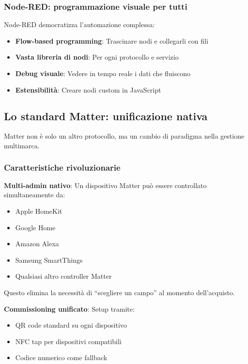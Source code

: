 \subsubsection{Node-RED: programmazione visuale per tutti}

Node-RED democratizza l'automazione complessa:

\begin{itemize}
    \item \textbf{Flow-based programming}: Trascinare nodi e collegarli con fili
    \item \textbf{Vasta libreria di nodi}: Per ogni protocollo e servizio
    \item \textbf{Debug visuale}: Vedere in tempo reale i dati che fluiscono
    \item \textbf{Estensibilità}: Creare nodi custom in JavaScript
\end{itemize}

\subsection{Lo standard Matter: unificazione nativa}

Matter non è solo un altro protocollo, ma un cambio di paradigma nella gestione multimarca.

\subsubsection{Caratteristiche rivoluzionarie}

\textbf{Multi-admin nativo}: Un dispositivo Matter può essere controllato simultaneamente da:
\begin{itemize}
    \item Apple HomeKit
    \item Google Home
    \item Amazon Alexa
    \item Samsung SmartThings
    \item Qualsiasi altro controller Matter
\end{itemize}

Questo elimina la necessità di ``scegliere un campo'' al momento dell'acquisto.

\textbf{Commissioning unificato}: Setup tramite:
\begin{itemize}
    \item QR code standard su ogni dispositivo
    \item NFC tap per dispositivi compatibili
    \item Codice numerico come fallback
\end{itemize}

